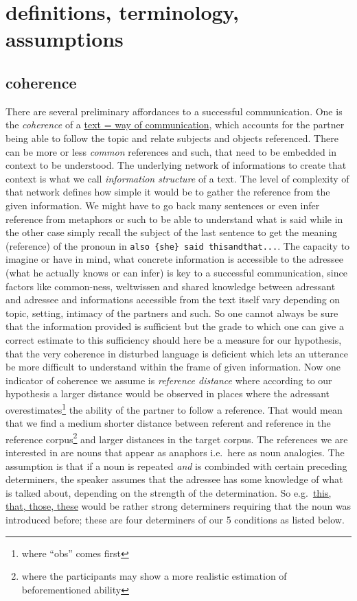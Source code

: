 \documentclass[12pt,a4paper]{article}
\begin{document}
\section{definitions, terminology, assumptions}\label{definitions-terminology-assumptions}

\subsection{coherence}\label{coherence}

There are several preliminary affordances to a successful communication. One is the \emph{coherence} of a \href{}{text = way of communication}, which accounts for the partner being able to follow the topic and relate subjects and objects referenced. There can be more or less \emph{common} references and such, that need to be embedded in context to be understood. The underlying network of informations to create that context is what we call \emph{information structure} of a text. The level of complexity of that network defines how simple it would be to gather the reference from the given information. We might have to go back many sentences or even infer reference from metaphors or such to be able to understand what is said while in the other case simply recall the subject of the last sentence to get the meaning (reference) of the pronoun in \texttt{also\ \{she\}\ said\ thisandthat...}.
The capacity to imagine or have in mind, what concrete information is accessible to the adressee (what he actually knows or can infer) is key to a successful communication, since factors like common-ness, weltwissen and shared knowledge between adressant and adressee and informations accessible from the text itself vary depending on topic, setting, intimacy of the partners and such. So one cannot always be sure that the information provided is sufficient but the grade to which one can give a correct estimate to this sufficiency should here be a measure for our hypothesis, that the very coherence in disturbed language is deficient which lets an utterance be more difficult to understand within the frame of given information.
Now one indicator of coherence we assume is \emph{reference distance} where according to our hypothesis a larger distance would be observed in places where the adressant overestimates\footnote{where ``obs'' comes first} the ability of the partner to follow a reference. That would mean that we find a medium shorter distance between referent and reference in the reference corpus\footnote{where the participants may show a more realistic estimation of beforementioned ability} and larger distances in the target corpus. The references we are interested in are nouns that appear as anaphors i.e.~here as noun analogies. The assumption is that if a noun is repeated \emph{and} is combinded with certain preceding determiners, the speaker assumes that the adressee has some knowledge of what is talked about, depending on the strength of the determination. So e.g.~\href{}{this, that, those, these} would be rather strong determiners requiring that the noun was introduced before; these are four determiners of our 5 conditions as listed below.
\end{document}

